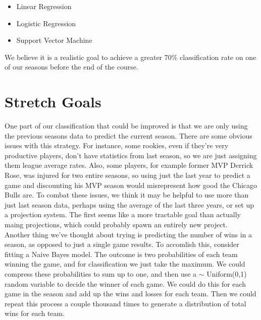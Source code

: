 \documentclass{article}
\begin{document}
	\begin{itemize}
		\item Linear Regression
		\item Logistic Regression
		\item Support Vector Machine
	\end{itemize}

	We believe it is a realistic goal to achieve a greater 70\% classification rate on one of our seasons before the end of the course. 

\section{Stretch Goals}
	One part of our classification that could be improved is that we are only using the previous seasons data to predict the current season. There are some obvious issues with this strategy. For instance, some rookies, even if they're very productive players, don't have statistics from last season, so we are just assigning them league average rates. Also, some players, for example former MVP Derrick Rose, was injured for two entire seasons, so using just the last year to predict a game and discounting his MVP season would misrepresent how good the Chicago Bulls are. To combat these issues, we think it may be helpful to use more than just last season data, perhaps using the average of the last three years, or set up a projection system. The first seems like a more tractable goal than actually maing projections, which could probably spawn an entirely new project. \\
		
	Another thing we've thought about trying is predicting the number of wins in a season, as opposed to just a single game results. To accomlish this, consider fitting a Naive Bayes model. The outcome is two probabilities of each team winning the game, and for classification we just take the maximum. We could compress these probabilities to sum up to one, and then use a $\sim$ Uniform(0,1) random variable to decide the winner of each game. We could do this for each game in the season and add up the wins and losses for each team. Then we could repeat this process a couple thousand times to generate a distribution of total wins for each team. 
\end{document}
